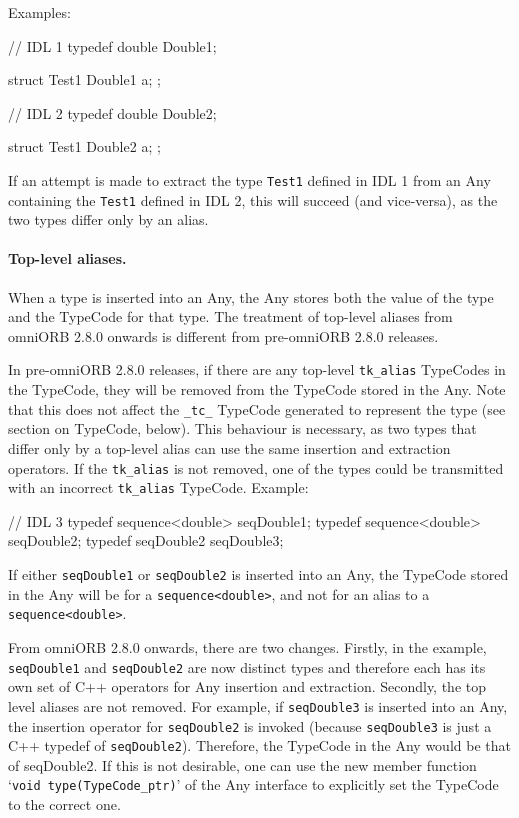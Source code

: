 \documentclass[11pt,twoside,a4paper]{book}
\newcommand{\type}[1]{\texttt{#1}}
\newcommand{\code}[1]{\texttt{#1}}
\begin{document}
Examples:

\begin{idllisting}
// IDL 1
typedef double Double1;

struct Test1 {
  Double1 a;
};
\end{idllisting}

\begin{idllisting}
// IDL 2
typedef double Double2;

struct Test1 {
  Double2 a;
};
\end{idllisting}
    
If an attempt is made to extract the type \type{Test1} defined in IDL
1 from an Any containing the \type{Test1} defined in IDL 2, this will
succeed (and vice-versa), as the two types differ only by an alias.

\paragraph*{Top-level aliases.}
When a type is inserted into an Any, the Any stores both the value of
the type and the TypeCode for that type. The treatment of top-level
aliases from omniORB 2.8.0 onwards is different from pre-omniORB 2.8.0
releases.

In pre-omniORB 2.8.0 releases, if there are any top-level
\code{tk\_alias} TypeCodes in the TypeCode, they will be removed from
the TypeCode stored in the Any. Note that this does not affect the
\code{\_tc\_} TypeCode generated to represent the type (see section on
TypeCode, below). This behaviour is necessary, as two types that
differ only by a top-level alias can use the same insertion and
extraction operators. If the \code{tk\_alias} is not removed, one of
the types could be transmitted with an incorrect \code{tk\_alias}
TypeCode. Example:

\begin{idllisting}
// IDL 3
typedef sequence<double> seqDouble1;
typedef sequence<double> seqDouble2;
typedef seqDouble2       seqDouble3;
\end{idllisting}

If either \type{seqDouble1} or \type{seqDouble2} is inserted into an
Any, the TypeCode stored in the Any will be for a
\code{sequence<double>}, and not for an alias to a
\code{sequence<double>}.

From omniORB 2.8.0 onwards, there are two changes. Firstly, in the
example, \type{seqDouble1} and \type{seqDouble2} are now distinct
types and therefore each has its own set of C++ operators for Any
insertion and extraction. Secondly, the top level aliases are not
removed. For example, if \type{seqDouble3} is inserted into an Any,
the insertion operator for \type{seqDouble2} is invoked (because
\type{seqDouble3} is just a C++ typedef of
\type{seqDouble2}). Therefore, the TypeCode in the Any would be that
of seqDouble2. If this is not desirable, one can use the new member
function `\code{void type(TypeCode\_ptr)}' of the Any interface to
explicitly set the TypeCode to the correct one.
\end{document}
